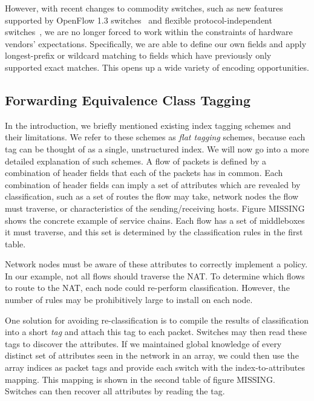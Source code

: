   However, with recent changes to commodity switches, such as new features supported by OpenFlow 1.3 switches~\cite{of13} and flexible protocol-independent switches~\cite{P4}, we are no longer forced to work within the constraints of hardware vendors' expectations. Specifically, we are able to define our own fields and apply longest-prefix or wildcard matching to fields which have previously only supported exact matches. This opens up a wide variety of encoding opportunities.

\subsection{Forwarding Equivalence Class Tagging}
  
In the introduction, we briefly mentioned existing index tagging schemes and their limitations. We refer to these schemes as \textit{flat tagging} schemes, because each tag can be thought of as a single, unstructured index.  We will now go into a more detailed explanation of such schemes. A flow of packets is defined by a combination of header fields that each of the packets has in common. Each combination of header fields can imply a set of attributes which are revealed by classification, such as a set of routes the flow may take, network nodes the flow must traverse, or characteristics of the sending/receiving hosts. 
Figure MISSING shows the concrete example of service chains. Each flow has a set of middleboxes it must traverse, and this set is determined by the classification rules in the first table.

Network nodes must be aware of these attributes to correctly implement a policy. In our example, not all flows should traverse the NAT. To determine which flows to route to the NAT, each node could re-perform classification. However, the number of rules may be prohibitively large to install on each node. 

One solution for avoiding re-classification is to compile the results of classification into a short \textit{tag} and attach this tag to each packet. Switches may then read these tags to discover the attributes. If we maintained global knowledge of every distinct set of attributes seen in the network in an array, we could then use the array indices as packet tags and provide each switch with the index-to-attributes mapping. This mapping is shown in the second table of figure MISSING. Switches can then recover all attributes by reading the tag. 


